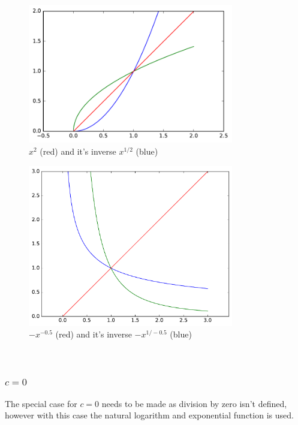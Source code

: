\documentclass[]{article}
\begin{document}
\begin{figure}[h!]
\centering
\includegraphics[width=0.8\textwidth]{figs/a_2_sgn_pow.pdf}
\caption{$x^2$ (red) and it's inverse $x^{1/2}$ (blue)}
\label{fig:sgn_pow}
\end{figure}

\begin{figure}[h!]
\centering
\includegraphics[width=0.8\textwidth]{figs/a_0_5_sgn_pow.pdf}
\caption{$-x^{-0.5}$ (red) and it's inverse $-x^{1/-0.5}$ (blue)}
\label{fig:sgn_pow_0_5}
\end{figure}

\pagebreak

\ \\

\pagebreak

\subsubsection{$c = 0$}

The special case for $c = 0$ needs to be made as division by zero isn't defined, however with this case the natural logarithm and exponential function is used.
\end{document}
